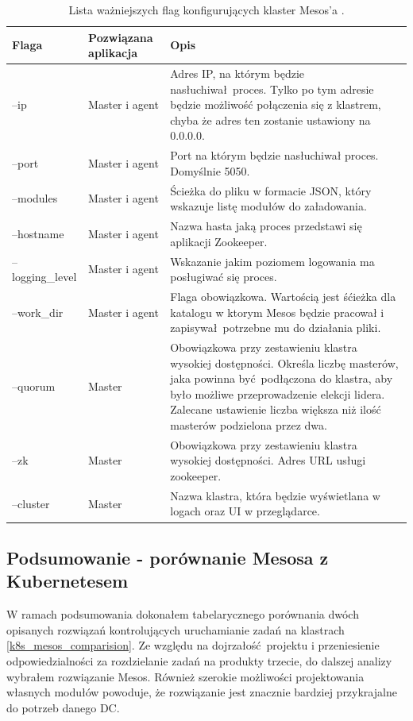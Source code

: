 \documentclass[10pt,a4paper,titlepage,twoside]{report}
\begin{document}
\begin{table}[!htbp]
\caption{Lista ważniejszych flag konfigurujących klaster Mesos'a \cite{ad34}.}
\label{mesos_flags}
\centering
\begin{tabular}{|p{3cm}|p{3cm}|p{8cm}|}
  \hline
  \textbf{Flaga} & \textbf{Pozwiązana aplikacja} & \textbf{Opis}\\
  \hline
  --ip & Master i agent & Adres IP, na którym będzie nasłuchiwał proces. Tylko po tym adresie będzie możliwość połączenia się z klastrem, chyba że adres ten zostanie ustawiony na 0.0.0.0. \\
  \hline
  --port & Master i agent & Port na którym będzie nasłuchiwał proces. Domyślnie 5050. \\
  \hline
  --modules & Master i agent & Ścieżka do pliku w formacie JSON, który wskazuje listę modułów do załadowania. \\
  \hline
  --hostname & Master i agent & Nazwa hasta jaką proces przedstawi się aplikacji Zookeeper. \\
  \hline
  --logging\_level & Master i agent & Wskazanie jakim poziomem logowania ma posługiwać się proces.  \\
  \hline
  --work\_dir & Master i agent & Flaga obowiązkowa. Wartością jest śćieżka dla katalogu w ktorym Mesos będzie pracował i zapisywał potrzebne mu do działania pliki. \\
  \hline
  --quorum & Master & Obowiązkowa przy zestawieniu klastra wysokiej dostępności. Określa liczbę masterów, jaka powinna być podłączona do klastra, aby było możliwe przeprowadzenie elekcji lidera. Zalecane ustawienie liczba większa niż ilość masterów podzielona przez dwa. \\
  \hline
  --zk & Master & Obowiązkowa przy zestawieniu klastra wysokiej dostępności. Adres URL usługi zookeeper. \\
  \hline
  --cluster & Master & Nazwa klastra, która będzie wyświetlana w logach oraz UI w przeglądarce. \\
  \hline
\end{tabular}
\end{table}

\subsection{Podsumowanie - porównanie Mesosa z Kubernetesem}
W ramach podsumowania dokonałem tabelarycznego porównania dwóch opisanych rozwiązań kontrolujących uruchamianie zadań na klastrach \ref{k8s_mesos_comparision}. Ze względu na dojrzałość projektu i przeniesienie odpowiedzialności za rozdzielanie zadań na produkty trzecie, do dalszej analizy wybrałem rozwiązanie Mesos. Również szerokie możliwości projektowania własnych modułów powoduje, że rozwiązanie jest znacznie bardziej przykrajalne do potrzeb danego DC.
\end{document}

